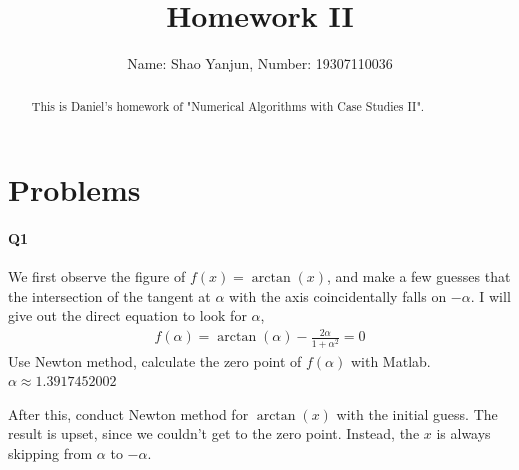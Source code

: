 \documentclass[11pt]{article}
\title{Homework II}
\author{Name: Shao Yanjun, Number: 19307110036}
\begin{document}
\maketitle

\begin{abstract}
This is Daniel's homework of  "Numerical Algorithms with Case Studies II".
\end{abstract}
\section{Problems}
\paragraph{Q1}
We first observe the figure of $f(x)=\arctan(x)$, and make a few guesses that the intersection of the tangent at $\alpha$ with the axis coincidentally falls on $-\alpha$. I will give out the direct equation to look for $\alpha$,
\begin{align}
	f(\alpha)=\arctan(\alpha)-\frac{2\alpha}{1+\alpha^2}=0
\end{align}
\hspace*{0.4cm}
Use Newton method, calculate the zero point of $f(\alpha)$ with Matlab. $\alpha\approx1.3917452002$
\begin{figure}[H]
	\centering
\end{figure}
After this, conduct Newton method for $\arctan(x)$ with the initial guess. The result is upset, since we couldn't get to the zero point. Instead, the $x$ is always skipping from $\alpha$ to $-\alpha$.
\end{document}
